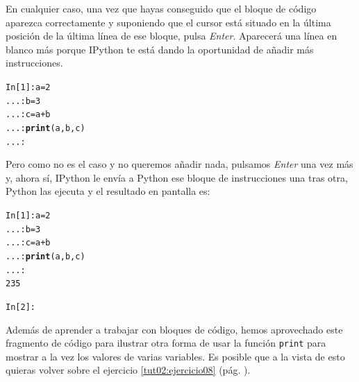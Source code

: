 \documentclass[10pt,a4paper]{article}\usepackage[]{graphicx}\usepackage[]{color}
\makeatletter
\newcommand{\hlkwd}[1]{\textcolor[rgb]{0.737,0.353,0.396}{\textbf{#1}}}%
\newenvironment{kframe}{%
 \def\at@end@of@kframe{}%
 \ifinner\ifhmode%
  \def\at@end@of@kframe{\end{minipage}}%
  \begin{minipage}{\columnwidth}%
 \fi\fi%
 \def\FrameCommand##1{\hskip\@totalleftmargin \hskip-\fboxsep
 \colorbox{shadecolor}{##1}\hskip-\fboxsep
     \hskip-\linewidth \hskip-\@totalleftmargin \hskip\columnwidth}%
 \MakeFramed {\advance\hsize-\width
   \@totalleftmargin\z@ \linewidth\hsize
   \@setminipage}}%
 {\par\unskip\endMakeFramed%
 \at@end@of@kframe}
\newenvironment{knitrout}{}{} %
\makeatother
\begin{document}
En cualquier caso, una vez que hayas conseguido que el bloque de código aparezca correctamente y suponiendo que el cursor está situado en la última posición de la última línea de ese bloque, pulsa {\em Enter}. Aparecerá una línea en blanco más porque IPython te está dando la oportunidad de añadir más instrucciones.
\begin{knitrout}
\color{fgcolor}\begin{kframe}
\begin{alltt}
In [1]: a = 2
   ...: b = 3
   ...: c = a + b
   ...: \hlkwd{print}(a, b, c)
   ...:
\end{alltt}
\end{kframe}
\end{knitrout}
Pero como no es el caso y  no queremos añadir nada, pulsamos {\em Enter} una vez más y, ahora sí, IPython le envía a Python ese bloque de instrucciones una tras otra, Python las ejecuta y el resultado en pantalla es:
\begin{knitrout}
\color{fgcolor}\begin{kframe}
\begin{alltt}
In [1]: a = 2
   ...: b = 3
   ...: c = a + b
   ...: \hlkwd{print}(a, b, c)
   ...:
2 3 5

In [2]:
\end{alltt}
\end{kframe}
\end{knitrout}
Además de aprender a trabajar con bloques de código, hemos aprovechado este fragmento de código para ilustrar otra forma de usar la función {\tt print} para mostrar a la vez los valores de varias variables. Es posible que a la vista de esto quieras volver sobre el ejercicio \ref{tut02:ejercicio08} (pág. \pageref{tut02:ejercicio08}).
\end{document}

